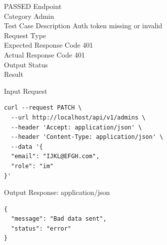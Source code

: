 \begin{testcase}{34}{PASSED}
Endpoint \hfill {}\\
Category \hfill Admin\\
Test Case Description \hfill Auth token missing or invalid\\

Request Type    \hfill {}\\
Expected Response Code    \hfill 401\\
Actual Response Code    \hfill 401\\

Output Status \hfill {}\\
Result \hfill {}

\begin{ipblock}{Input Request}
\begin{verbatim}
curl --request PATCH \
  --url http://localhost/api/v1/admins \
  --header 'Accept: application/json' \
  --header 'Content-Type: application/json' \
  --data '{
  "email": "IJKL@EFGH.com",
  "role": "im"
}'
\end{verbatim}
\end{ipblock}

\begin{opblock}{Output Response: application/json}
\begin{verbatim}
{
  "message": "Bad data sent",
  "status": "error"
}
\end{verbatim}
\end{opblock}
\end{testcase}

